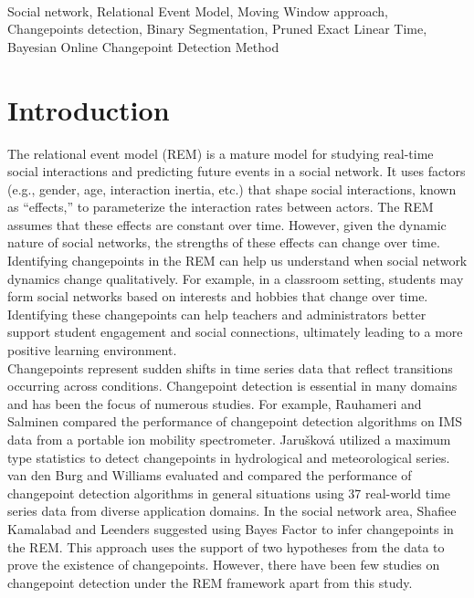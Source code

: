 \documentclass[]{interact}
\theoremstyle{plain}%
\theoremstyle{definition}
\theoremstyle{remark}
\begin{document}
	 \\
	{\small{Social network, Relational Event Model, Moving Window approach, Changepoints detection, Binary Segmentation, Pruned Exact Linear Time, Bayesian Online Changepoint Detection Method}
	
	\newpage


	\section{\fontsize{14}{15}\selectfont Introduction}
	
	\hspace{0.2cm} The relational event model (REM) is a mature model for studying real-time social interactions and predicting future events in a social network. It uses factors (e.g., gender, age, interaction inertia, etc.) that shape social interactions, known as ``effects,''\cite{buttsRelationalEventFramework2008} to parameterize the interaction rates between actors. The REM assumes that these effects are constant over time. However, given the dynamic nature of social networks, the strengths of these effects can change over time. Identifying changepoints in the REM can help us understand when social network dynamics change qualitatively. For example, in a classroom setting, students may form social networks based on interests and hobbies that change over time. Identifying these changepoints can help teachers and administrators better support student engagement and social connections, ultimately leading to a more positive learning environment. \\
	
	Changepoints represent sudden shifts in time series data that reflect transitions occurring across conditions\cite{sharmaTrendAnalysisChange2016}\cite{aminikhanghahiSurveyMethodsTime2017}. Changepoint detection is essential in many domains and has been the focus of numerous studies. For example, Rauhameri and Salminen compared the performance of changepoint detection algorithms on IMS data from a portable ion mobility spectrometer\cite{rauhameriComparisonOnlineMethods2022}. Jarušková utilized a maximum type statistics to detect changepoints in hydrological and meteorological series\cite{jaruskovaProblemsApplicationChangePoint1997}. van den Burg and Williams evaluated and compared the performance of changepoint detection algorithms in general situations using 37 real-world time series data from diverse application domains\cite{burgEvaluationChangePoint2022}. In the social network area, Shafiee Kamalabad and Leenders suggested using Bayes Factor to infer changepoints in the REM\cite{shafieekamalabadWhatPointChange2023}. This approach uses the support of two hypotheses from the data to prove the existence of changepoints. However, there have been few studies on changepoint detection under the REM framework apart from this study. \\
	
}
\end{document}
